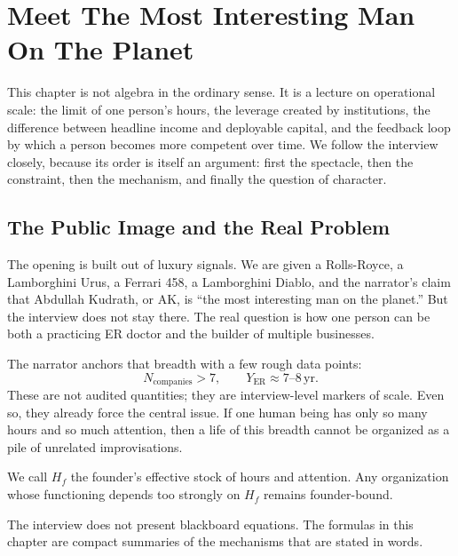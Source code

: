\chapter{Meet The Most Interesting Man On The Planet}

This chapter is not algebra in the ordinary sense. It is a lecture on operational scale: the limit of one person's hours, the leverage created by institutions, the difference between headline income and deployable capital, and the feedback loop by which a person becomes more competent over time. We follow the interview closely, because its order is itself an argument: first the spectacle, then the constraint, then the mechanism, and finally the question of character.

\section{The Public Image and the Real Problem}

The opening is built out of luxury signals. We are given a Rolls-Royce, a Lamborghini Urus, a Ferrari 458, a Lamborghini Diablo, and the narrator's claim that Abdullah Kudrath, or AK, is ``the most interesting man on the planet.'' But the interview does not stay there. The real question is how one person can be both a practicing ER doctor and the builder of multiple businesses.

The narrator anchors that breadth with a few rough data points:
\begin{equation}
N_{\text{companies}} > 7, 
\qquad
Y_{\text{ER}} \approx 7\text{--}8\,\mathrm{yr}.
\end{equation}
These are not audited quantities; they are interview-level markers of scale. Even so, they already force the central issue. If one human being has only so many hours and so much attention, then a life of this breadth cannot be organized as a pile of unrelated improvisations.

\begin{definition}
We call \(H_f\) the founder's effective stock of hours and attention. Any organization whose functioning depends too strongly on \(H_f\) remains founder-bound.
\end{definition}

\begin{remark}
The interview does not present blackboard equations. The formulas in this chapter are compact summaries of the mechanisms that are stated in words.
\end{remark}

